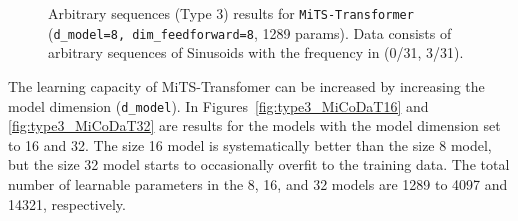 \documentclass[final]{article}
\begin{document}
\begin{figure}[h]
  \caption{Arbitrary sequences (Type 3) results for \texttt{MiTS-Transformer} (\texttt{d\_model=8, dim\_feedforward=8}, 1289 params). Data consists of arbitrary sequences of Sinusoids with the frequency in (0/31, 3/31).\label{fig:type3_MiCoDaT8}}
\end{figure}

The learning capacity of MiTS-Transfomer can be increased by increasing the model dimension (\texttt{d\_model}). In Figures~\ref{fig:type3_MiCoDaT16} and \ref{fig:type3_MiCoDaT32} are results for the models with the model dimension set to 16 and 32. The size 16 model is systematically better than the size 8 model, but the size 32 model starts to occasionally overfit to the training data. The total number of learnable parameters in the 8, 16, and 32 models are 1289 to 4097 and 14321, respectively.
\end{document}
